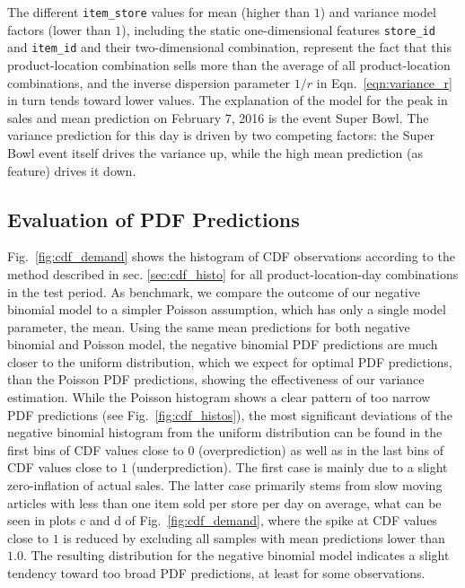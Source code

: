 \documentclass[BCOR=1mm, DIV=calc,10pt,
twoside=true,
twocolumn,
headings=normal]{scrartcl}
\newcommand{\fig}{Fig.~}
\newcommand{\eqn}{Eqn.~}
\begin{document}
\noindent
The different \texttt{item\_store} values for mean (higher than $1$) and variance model factors (lower than $1$), including the static one-dimensional features \texttt{store\_id} and \texttt{item\_id} and their two-dimensional combination, represent the fact that this product-location combination sells more than the average of all product-location combinations, and the inverse dispersion parameter $1/r$ in \eqn \eqref{eqn:variance_r} in turn tends toward lower values. The explanation of the model for the peak in sales and mean prediction on February 7, 2016 is the event Super Bowl. The variance prediction for this day is driven by two competing factors: the Super Bowl event itself drives the variance up, while the high mean prediction (as feature) drives it down.

\subsection{Evaluation of PDF Predictions}

\fig \ref{fig:cdf_demand} shows the histogram of CDF observations according to the method described in sec. \ref{sec:cdf_histo} for all product-location-day combinations in the test period. As benchmark, we compare the outcome of our negative binomial model to a simpler Poisson assumption, which has only a single model parameter, the mean. Using the same mean predictions for both negative binomial and Poisson model, the negative binomial PDF predictions are much closer to the uniform distribution, which we expect for optimal PDF predictions, than the Poisson PDF predictions, showing the effectiveness of our variance estimation. While the Poisson histogram shows a clear pattern of too narrow PDF predictions (see \fig \ref{fig:cdf_histos}), the most significant deviations of the negative binomial histogram from the uniform distribution can be found in the first bins of CDF values close to $0$ (overprediction) as well as in the last bins of CDF values close to $1$ (underprediction). The first case is mainly due to a slight zero-inflation of actual sales. The latter case primarily stems from slow moving articles with less than one item sold per store per day on average, what can be seen in plots c and d of \fig \ref{fig:cdf_demand}, where the spike at CDF values close to $1$ is reduced by excluding all samples with mean predictions lower than $1.0$. The resulting distribution for the negative binomial model indicates a slight tendency toward too broad PDF predictions, at least for some observations.
\end{document}

